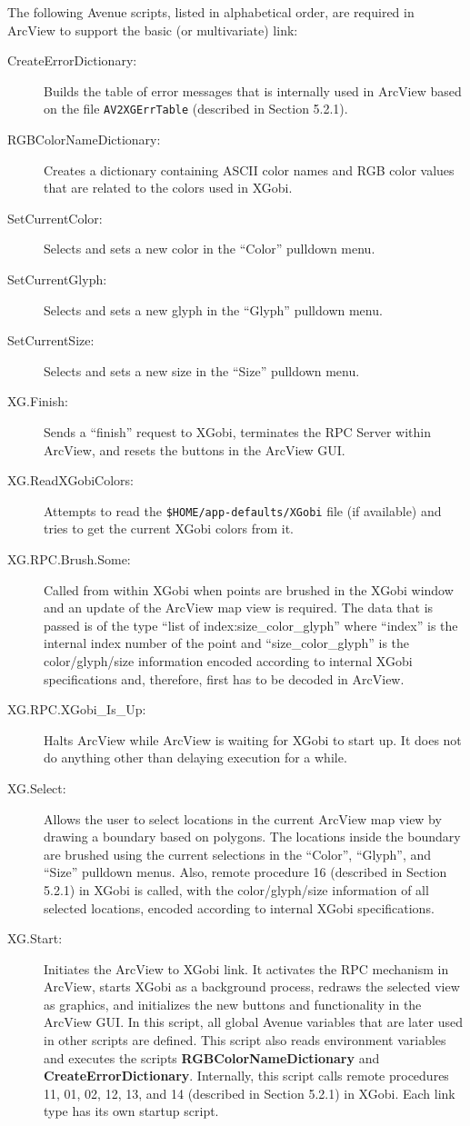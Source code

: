 The following Avenue scripts, listed in alphabetical order,
are required in ArcView to support the basic 
(or multivariate) link:
\begin{description}
\item[CreateErrorDictionary:] Builds the 
table of error messages that is internally used in ArcView
based on the file {\tt AV2XGErrTable} 
(described in Section 5.2.1).
\item[RGBColorNameDictionary:] Creates a dictionary containing
ASCII color names and RGB color values that are related to the
colors used in XGobi.
\item[SetCurrentColor:] Selects and sets a 
new color in the ``Color'' pulldown menu.
\item[SetCurrentGlyph:] Selects and sets a 
new glyph in the ``Glyph'' pulldown menu.
\item[SetCurrentSize:] Selects and sets a 
new size in the ``Size'' pulldown menu.
\item[XG.Finish:] Sends a ``finish'' request to XGobi, terminates the
RPC Server within ArcView, and resets the buttons in the ArcView GUI.
\item[XG.ReadXGobiColors:] Attempts to read 
the {\tt \$HOME/app-defaults/XGobi} file (if available) and 
tries to get the current XGobi colors from it.
\item[XG.RPC.Brush.Some:] Called from within XGobi
when points are brushed in the XGobi window and an update of
the ArcView map view is required. The data that is passed is of the type
``list of index:size\_color\_glyph'' where ``index'' is the internal index
number of the point and ``size\_color\_glyph'' is the color/glyph/size
information encoded according to internal XGobi specifications
and, therefore, first has to be decoded in ArcView.
\item[XG.RPC.XGobi\_Is\_Up:] Halts ArcView 
while ArcView is waiting for XGobi to start up. 
It does not do anything other than delaying execution for a while.
\item[XG.Select:] Allows the user to select locations in the
current ArcView map view by drawing a boundary based on polygons.
The locations inside the boundary are brushed using the current
selections in the ``Color'', ``Glyph'', and ``Size'' pulldown menus.
Also, remote procedure 16 (described in Section 5.2.1) in XGobi
is called, with the color/glyph/size information of all
selected locations, encoded according to internal XGobi specifications.
\item[XG.Start:] Initiates the ArcView to XGobi link.
It activates the RPC mechanism in ArcView, starts XGobi as a 
background process, redraws the selected view as graphics, and
initializes the new buttons and functionality in the ArcView GUI. In
this script, all global Avenue  variables that are later used in 
other scripts are defined. This script also reads
environment variables and executes the scripts {\bf
RGBColorNameDictionary} and {\bf CreateErrorDictionary}. Internally,
this script calls remote procedures 11, 01, 02, 12, 13, and 14
(described in Section 5.2.1) in XGobi. Each link
type has its own startup script. 
\end{description}

